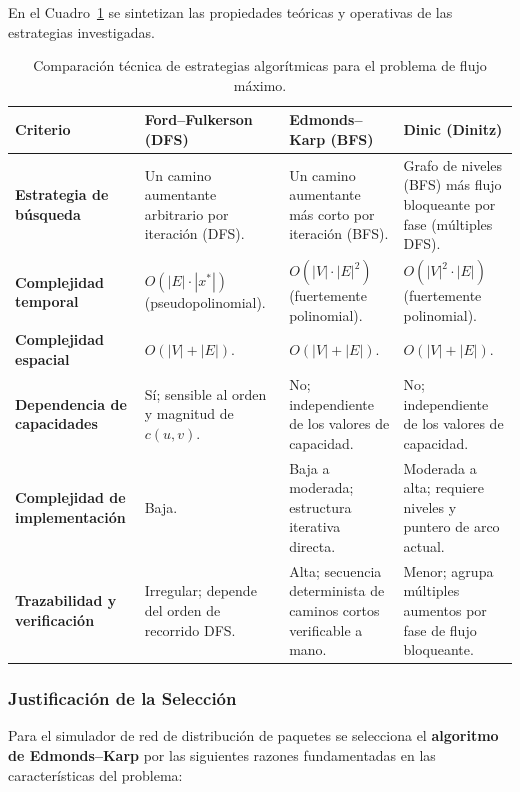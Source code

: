 \documentclass[11pt,a4paper]{article}
\begin{document}
En el Cuadro~\ref{tab:comparacion_algoritmos} se sintetizan las propiedades teóricas y operativas de las estrategias investigadas.

\begin{table}[H]
\centering
\caption{Comparación técnica de estrategias algorítmicas para el problema de flujo máximo.}
\label{tab:comparacion_algoritmos}
\begin{tabular}{p{2.5cm}p{3.8cm}p{3.8cm}p{3.8cm}}
\toprule
\textbf{Criterio} & \textbf{Ford--Fulkerson (DFS)} & \textbf{Edmonds--Karp (BFS)} & \textbf{Dinic (Dinitz)} \\
\midrule
\textbf{Estrategia de búsqueda} & Un camino aumentante arbitrario por iteración (DFS). & Un camino aumentante más corto por iteración (BFS). & Grafo de niveles (BFS) más flujo bloqueante por fase (múltiples DFS). \\
\textbf{Complejidad temporal} & $O(|E| \cdot |x^*|)$ (pseudopolinomial). & $O(|V| \cdot |E|^2)$ (fuertemente polinomial). & $O(|V|^2 \cdot |E|)$ (fuertemente polinomial). \\
\textbf{Complejidad espacial} & $O(|V| + |E|)$. & $O(|V| + |E|)$. & $O(|V| + |E|)$. \\
\textbf{Dependencia de capacidades} & Sí; sensible al orden y magnitud de $c(u, v)$. & No; independiente de los valores de capacidad. & No; independiente de los valores de capacidad. \\
\textbf{Complejidad de implementación} & Baja. & Baja a moderada; estructura iterativa directa. & Moderada a alta; requiere niveles y puntero de arco actual. \\
\textbf{Trazabilidad y verificación} & Irregular; depende del orden de recorrido DFS. & Alta; secuencia determinista de caminos cortos verificable a mano. & Menor; agrupa múltiples aumentos por fase de flujo bloqueante. \\
\bottomrule
\end{tabular}
\end{table}

\subsubsection{Justificación de la Selección}

Para el simulador de red de distribución de paquetes se selecciona el \textbf{algoritmo de Edmonds--Karp} \cite{edmonds1972} por las siguientes razones fundamentadas en las características del problema:
\end{document}
